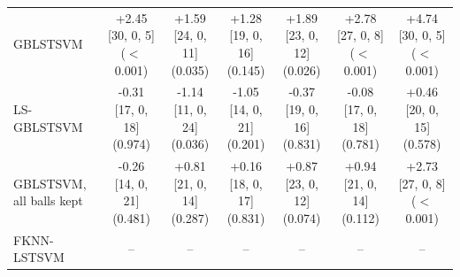 \begin{table}[!t]
{\begin{tabular}{lcccccc}
GBLSTSVM & \shortstack{+2.45 [30, 0, 5]\\($<$0.001)} & \shortstack{+1.59 [24, 0, 11]\\(0.035)} & \shortstack{+1.28 [19, 0, 16]\\(0.145)} & \shortstack{+1.89 [23, 0, 12]\\(0.026)} & \shortstack{+2.78 [27, 0, 8]\\($<$0.001)} & \shortstack{+4.74 [30, 0, 5]\\($<$0.001)} \\[4pt]
LS-GBLSTSVM & \shortstack{-0.31 [17, 0, 18]\\(0.974)} & \shortstack{-1.14 [11, 0, 24]\\(0.036)} & \shortstack{-1.05 [14, 0, 21]\\(0.201)} & \shortstack{-0.37 [19, 0, 16]\\(0.831)} & \shortstack{-0.08 [17, 0, 18]\\(0.781)} & \shortstack{+0.46 [20, 0, 15]\\(0.578)} \\[4pt]
GBLSTSVM, all balls kept & \shortstack{-0.26 [14, 0, 21]\\(0.481)} & \shortstack{+0.81 [21, 0, 14]\\(0.287)} & \shortstack{+0.16 [18, 0, 17]\\(0.831)} & \shortstack{+0.87 [23, 0, 12]\\(0.074)} & \shortstack{+0.94 [21, 0, 14]\\(0.112)} & \shortstack{+2.73 [27, 0, 8]\\($<$0.001)} \\[4pt]
FKNN-LSTSVM & -- & -- & -- & -- & -- & -- \\[4pt]
\bottomrule
\end{tabular}}
\end{table}
